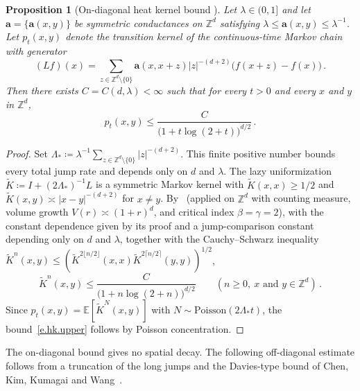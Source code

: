 \documentclass[11pt]{amsart}
\theoremstyle{plain}
\newtheorem{proposition}[theorem]{Proposition}
\theoremstyle{definition}
\theoremstyle{remark}
\newcommand{\E}{\mathbb{E}}
\newcommand{\Zd}{\mathbb{Z}^d}
\renewcommand{\a}{\mathbf{a}}
\begin{document}
	\begin{proposition}[On-diagonal heat kernel bound {\cite[Theorem~1.1]{MuruganSaloffCoste2015}}]
		\label{p.heatkernel}
		Let $\lambda \in (0,1]$ and let $\a = \{\a(x,y)\}$ be symmetric conductances on $\Zd$ satisfying $\lambda \le \a(x,y) \le \lambda^{-1}$.
		Let $p_t(x,y)$ denote the transition kernel of the continuous-time Markov chain with generator
		\[
		(Lf)(x) = \sum_{z \in \Zd \setminus \{0\}} \a(x, x{+}z) |z|^{-(d+2)} \bigl(f(x{+}z) - f(x)\bigr)\,.
		\]
		Then there exists $C = C(d,\lambda) < \infty$ such that for every $t > 0$ and every $x$ and $y$ in $\Zd$,
		\begin{equation}
			\label{e.hk.upper}
			p_t(x,y) \le \frac{C}{\bigl(1 + t \log(2{+}t)\bigr)^{d/2}}\,.
		\end{equation}
	\end{proposition}
	
	\begin{proof}
		Set $\Lambda_* \coloneqq \lambda^{-1}\sum_{z \in \Zd \setminus \{0\}}|z|^{-(d+2)}$. This finite positive number bounds every total jump rate and depends only on $d$ and $\lambda$.
		The lazy uniformization $\widetilde K \coloneqq I + (2\Lambda_*)^{-1}L$ is a symmetric Markov kernel with $\widetilde K(x,x) \ge 1/2$ and $\widetilde K(x,y) \asymp |x-y|^{-(d+2)}$ for $x \ne y$.
		By~\cite[Theorem~1.1]{MuruganSaloffCoste2015} (applied on $\Zd$ with counting measure, volume growth $V(r) \asymp (1+r)^d$, and critical index $\beta = \gamma = 2$), with the constant dependence given by its proof and a jump-comparison constant depending only on $d$ and $\lambda$, together with the Cauchy--Schwarz inequality $\widetilde K^n(x,y) \le (\widetilde K^{2\lfloor n/2\rfloor}(x,x)\widetilde K^{2\lceil n/2\rceil}(y,y))^{1/2}$,
		\[
		\widetilde K^n(x,y) \le \frac{C}{\bigl(1 + n\log(2{+}n)\bigr)^{d/2}} \qquad (n \ge 0,\ x \text{ and } y \in \Zd)\,.
		\]
		Since $p_t(x,y) = \E[\widetilde K^N(x,y)]$ with $N \sim \mathrm{Poisson}(2\Lambda_* t)$, the bound~\eqref{e.hk.upper} follows by Poisson concentration.
	\end{proof}
	
	The on-diagonal bound gives no spatial decay.
	The following off-diagonal estimate follows from a truncation of the long jumps and the Davies-type bound of Chen, Kim, Kumagai and Wang~\cite{ChenKimKumagaiWang2021}.
	
\end{document}
